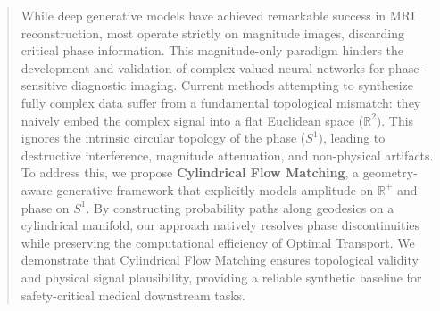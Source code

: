 \begin{abstract}
While deep generative models have achieved remarkable success in MRI reconstruction, most operate strictly on magnitude images, discarding critical phase information. This magnitude-only paradigm hinders the development and validation of complex-valued neural networks for phase-sensitive diagnostic imaging. Current methods attempting to synthesize fully complex data suffer from a fundamental topological mismatch: they naively embed the complex signal into a flat Euclidean space ($\mathbb{R}^2$). This ignores the intrinsic circular topology of the phase ($S^1$), leading to destructive interference, magnitude attenuation, and non-physical artifacts. To address this, we propose \textbf{Cylindrical Flow Matching}, a geometry-aware generative framework that explicitly models amplitude on $\mathbb{R}^+$ and phase on $S^1$. By constructing probability paths along geodesics on a cylindrical manifold, our approach natively resolves phase discontinuities while preserving the computational efficiency of Optimal Transport. We demonstrate that Cylindrical Flow Matching ensures topological validity and physical signal plausibility, providing a reliable synthetic baseline for safety-critical medical downstream tasks.
\end{abstract}
